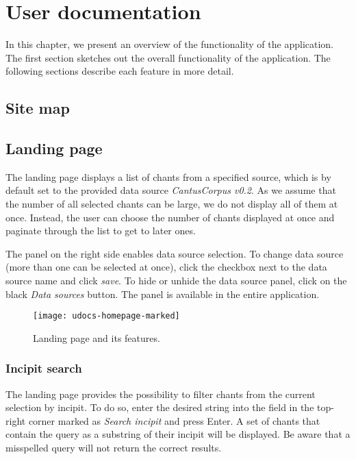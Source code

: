 \chapter{User documentation}

In this chapter, we present an overview of the functionality of the application. The first section sketches out the overall
functionality of the application. The following sections describe each feature in more detail.

\section{Site map}

\section{Landing page}

The landing page displays a list of chants from a specified source, which is by default set to the provided data source \emph{CantusCorpus v0.2}.
As we assume that the number of all selected chants can be large, we do not display all of them at once. Instead, the user can choose the number of
chants displayed at once and paginate through the list to get to later ones.

The panel on the right side enables data source selection. To change data source (more than one can be selected at once), click the checkbox next
to the data source name and click \emph{save}. To hide or unhide the data source panel, click on the black \emph{Data sources} button. The panel
is available in the entire application.

\begin{figure}[!h]
\centering
\texttt{[image: udocs-homepage-marked]}
\caption{Landing page and its features.}
\label{fig:land_page}
\end{figure}

\subsection{Incipit search}

The landing page provides the possibility to filter chants from the current selection by incipit. To do so, enter the desired string into
the field in the top-right corner marked as \emph{Search incipit} and press Enter. A set of chants that contain the query as a substring of their incipit will be displayed.
Be aware that a misspelled query will not return the correct results.

